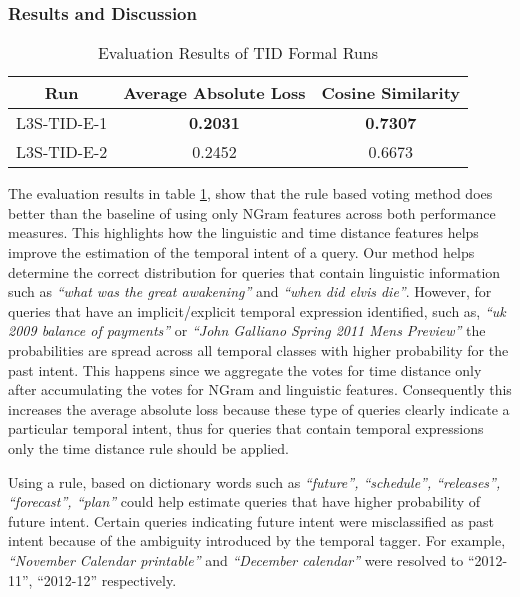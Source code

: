 \documentclass{sig-alternate}
\begin{document}
\subsubsection{Results and Discussion}
\begin{table}[htbp]
\centering
\begin{tabular}{|c|c|c|}
\hline
Run & Average Absolute Loss & Cosine Similarity \\
\hline
\hline
L3S-TID-E-1 & \textbf{0.2031} & \textbf{0.7307} \\
\hline
L3S-TID-E-2 & 0.2452 & 0.6673 \\
\hline
\end{tabular}  
\caption{Evaluation Results of TID Formal Runs}
\label{table:1}
\end{table}
The evaluation results in \textsf{table \ref{table:1}}, show that the \textsf{rule based voting} method does better than the baseline of using only \textsf{NGram features} across both performance measures. This highlights how the \textsf{linguistic} and \textsf{time distance} features helps improve the estimation of the temporal intent of a query. Our method helps determine the correct distribution for queries that contain linguistic information such as \textit{``what was the great awakening''} and \textit{``when did elvis die''}. However, for queries that have an implicit/explicit temporal expression identified, such as, \textit{``uk 2009 balance of payments''} or \textit{``John Galliano Spring 2011 Mens Preview''} the probabilities are spread across all temporal classes with higher probability for the past intent. This happens since we aggregate the votes for time distance only after accumulating the votes for NGram and linguistic features. Consequently this increases the average absolute loss because these type of queries clearly indicate a particular temporal intent, thus for queries that contain temporal expressions only the time distance rule should be applied. 

Using a rule, based on dictionary words such as \textit{``future'', ``schedule'', ``releases'', ``forecast'', ``plan''} could help estimate queries that have higher probability of future intent. Certain queries indicating future intent were misclassified as past intent because of the ambiguity introduced by the temporal tagger. For example, \textit{``November Calendar printable''} and \textit{``December calendar''} were resolved to ``2012-11'', ``2012-12'' respectively. 
\end{document}
